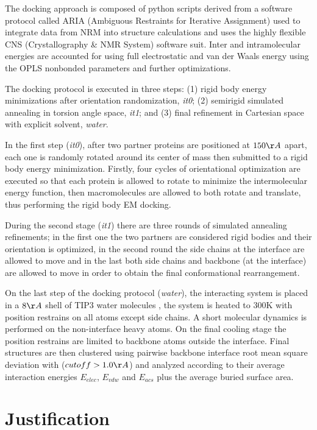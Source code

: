 \documentclass[
	12pt,				%
	openright,			%
	twoside,			%
	a4paper,			%
	english,			%
	french,				%
	spanish,			%
	brazil,				%
	]{abntex2}
\begin{document}
The docking approach is composed of python scripts derived from a software protocol called ARIA (Ambiguous Restraints for Iterative Assignment) \cite{Linge2001} used to integrate data from NRM into structure calculations and uses the highly flexible CNS (Crystallography \& NMR System) \cite{Brunger2013} software suit. Inter and intramolecular energies are accounted for using full electrostatic and van der Waals energy using the OPLS \cite{Jorgensen1988} nonbonded parameters and further optimizations. 

The docking protocol is executed in three steps: (1) rigid body energy minimizations after orientation randomization, \textit{it0}; (2) semirigid simulated annealing in torsion angle space, \textit{it1}; and (3) final refinement in Cartesian space with explicit solvent, \textit{water}.

In the first step (\textit{it0}), after two partner proteins are positioned at $150 \AA$ apart, each one is randomly rotated around its center of mass then submitted to a rigid body energy minimization. Firstly, four cycles of orientational optimization are executed so that each protein is allowed to rotate to minimize the intermolecular energy function, then macromolecules are allowed to both rotate and translate, thus performing the rigid body EM docking. 

During the second stage (\textit{it1}) there are three rounds of simulated annealing refinements; in the first one the two partners are considered rigid bodies and their orientation is optimized, in the second round the side chains at the interface are allowed to move and in the last both side chains and backbone (at the interface) are allowed to move in order to obtain the final conformational rearrangement.

On the last step of the docking protocol (\textit{water}), the interacting system is placed in a $8\AA$ shell of TIP3 water molecules \cite{Mark2001}, the system is heated to 300K with position restrains on all atoms except side chains. A short molecular dynamics is performed on the non-interface heavy atoms. On the final cooling stage the position restrains are limited to backbone atoms outside the interface.
Final structures are then clustered using pairwise backbone interface root mean square deviation with ($cutoff > 1.0 \AA$) and analyzed according to their average interaction energies $E_{elec}$, $E_{vdw}$ and $E_{acs}$ plus the average buried surface area. 

\chapter{Justification}
\end{document}
